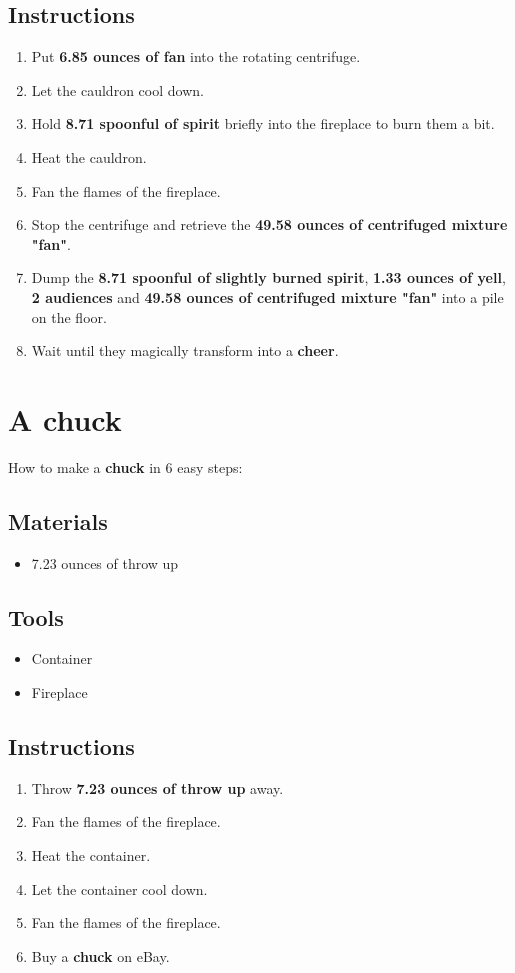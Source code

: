 \documentclass{article}
\begin{document}
\subsection{Instructions}\begin{enumerate}
\item 
Put \textbf{6.85 ounces of fan} into the rotating centrifuge.
\item 
Let the cauldron cool down.
\item 
Hold \textbf{8.71 spoonful of spirit} briefly into the fireplace to burn them a bit.
\item 
Heat the cauldron.
\item 
Fan the flames of the fireplace.
\item 
Stop the centrifuge and retrieve the \textbf{49.58 ounces of centrifuged mixture "fan"}.
\item 
Dump the \textbf{8.71 spoonful of slightly burned spirit}, \textbf{1.33 ounces of yell}, \textbf{2 audiences} and \textbf{49.58 ounces of centrifuged mixture "fan"} into a pile on the floor.
\item 
Wait until they magically transform into a \textbf{cheer}.
\end{enumerate}
\newpage
\section{A chuck}How to make a \textbf{chuck} in 6 easy steps:

\subsection{Materials}\begin{itemize}
\item 
7.23 ounces of throw up
\end{itemize}
\subsection{Tools}\begin{itemize}
\item 
Container
\item 
Fireplace
\end{itemize}
\subsection{Instructions}\begin{enumerate}
\item 
Throw \textbf{7.23 ounces of throw up} away.
\item 
Fan the flames of the fireplace.
\item 
Heat the container.
\item 
Let the container cool down.
\item 
Fan the flames of the fireplace.
\item 
Buy a \textbf{chuck} on eBay.
\end{enumerate}
\newpage
\end{document}
